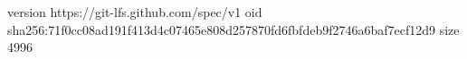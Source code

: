 version https://git-lfs.github.com/spec/v1
oid sha256:71f0cc08ad191f413d4c07465e808d257870fd6fbfdeb9f2746a6baf7ecf12d9
size 4996
